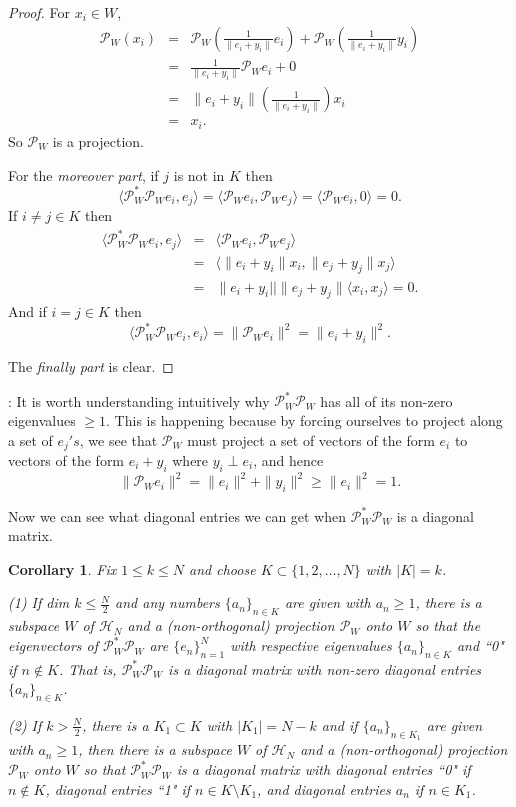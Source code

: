\documentclass[11pt,reqno]{amsart}
\newtheorem{corollary}[thm]{Corollary}
\theoremstyle{remark}
\begin{document}
\begin{proof}
For $x_i \in W$,
\begin{eqnarray*}
{\mathcal P}_W(x_i)&=& {\mathcal P}_W( \frac{1}{\|e_i+y_i\|}e_i )+ {\mathcal P}_W(\frac{1}{\|e_i+y_i\|}y_i)\\
&=& \frac{1}{\|e_i+y_i\|}{\mathcal P}_We_i + 0\\
&=& \|e_i+y_i\|(\frac{1}{\|e_i+y_i\|} )x_i\\
&=& x_i.
\end{eqnarray*}
So ${\mathcal P}_W$ is a projection.

For the {\em moreover part}, if  $j$ is not in $K$ then
\[ \langle {\mathcal P}_W^{*}{\mathcal P}_We_i,e_j \rangle = \langle {\mathcal P}_We_i,{\mathcal P}_We_j\rangle
= \langle {\mathcal P}_We_i,0\rangle =0.\]
If $i\not= j\in K$ then
\begin{eqnarray*}
\langle {\mathcal P}_W^{*}{\mathcal P}_We_i,e_j \rangle &=& \langle {\mathcal P}_We_i,{\mathcal P}_We_j\rangle\\
&=&\langle \|e_i+y_i\| x_i,\|e_j+y_j\|x_j\rangle\\
&=& \|e_i+y_i||\|e_j+y_j\|\langle x_i,x_j\rangle = 0.
\end{eqnarray*}
And if $i=j\in K$ then
\[ \langle {\mathcal P}_W^{*}{\mathcal P}_We_i,e_i \rangle = \|{\mathcal P}_We_i\|^2 = \|e_i+y_i\|^2.\]

The {\em finally part} is clear.
\end{proof}

:  It is worth understanding  intuitively why ${\mathcal P}_W^{*}{\mathcal P}_W$
has all of its non-zero eigenvalues $\ge 1$.  This is happening because by forcing
ourselves to project along a set of $e_j's$, we see that ${\mathcal P}_W$ must project a
set of vectors of the form $e_i$ to vectors of the form $e_i+y_i$ where
$y_i \perp e_i$, and hence
\[ \|{\mathcal P}_We_i \|^2= \|e_i\|^2+\|y_i\|^2 \ge \|e_i\|^2=1.\]

Now we can see what diagonal entries we can get when ${\mathcal P}_W^{*}{\mathcal P}_W$ is
a diagonal matrix.

\begin{corollary}\label{cor2}
Fix $1\le k\le N$ and choose $K\subset \{1,2,\ldots,N\}$ with $|K|=k$.

(1)  If dim $k \le \frac{N}{2}$ and any numbers $\{a_n\}_{n\in K}$ are given
with $a_n \ge 1$, there is a subspace $W$ of ${\mathcal H}_N$ and a (non-orthogonal) projection
${\mathcal P}_W$ onto $W$ so that the eigenvectors of ${\mathcal P}_W^{*}{\mathcal P}_W$ are
$\{e_n\}_{n=1}^N$  with respective eigenvalues $\{a_n\}_{n\in K}$ and ``0"
if $n\notin K$.  That is, ${\mathcal P}_W^{*}{\mathcal P}_W$ is a diagonal matrix with non-zero
diagonal entries $\{a_n\}_{n\in K}$.

(2)  If $k> \frac{N}{2}$, there is a $K_1 \subset K$ with $|K_1| = N-k$
and if $\{a_n\}_{n\in K_1}$ are given with $a_n\ge 1$, then there is a
subspace $W$ of ${\mathcal H}_N$ and a  (non-orthogonal)
projection ${\mathcal P}_W$ onto $W$ so that ${\mathcal P}_W^{*}{\mathcal P}_W$ is a diagonal matrix with diagonal
entries ``0" if $n\notin K$, diagonal entries ``1" if $n\in K\setminus K_1$,
and diagonal entries $a_n$ if $n\in K_1$.
\end{corollary}
\end{document}
